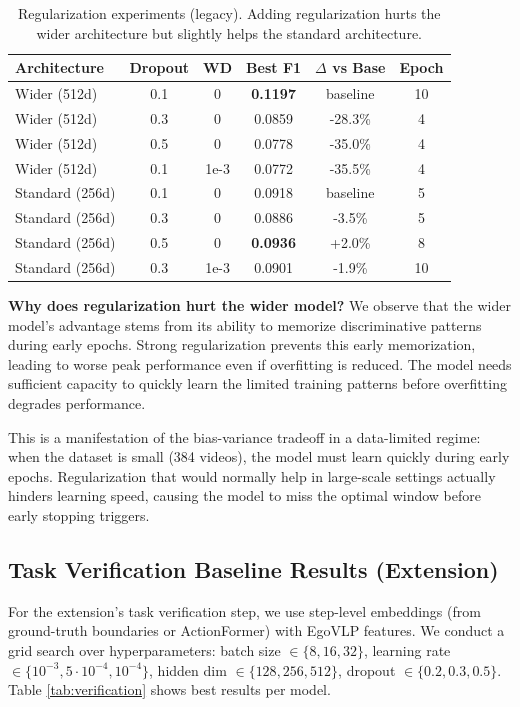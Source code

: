 \documentclass[10pt,twocolumn,letterpaper]{article}
\newcommand{\tighttabcolsep}{\setlength{\tabcolsep}{3pt}}
\newcommand{\tighttablerowstretch}{\renewcommand{\arraystretch}{1.05}}
\begin{document}
\begin{table}[h]
\centering
\caption{Regularization experiments (legacy). Adding regularization hurts the wider architecture but slightly helps the standard architecture.}
\label{tab:regularization}
{\scriptsize\tighttabcolsep\tighttablerowstretch
\begin{tabular}{lccccc}
\toprule
Architecture & Dropout & WD & Best F1 & $\Delta$ vs Base & Epoch \\
\midrule
Wider (512d) & 0.1 & 0 & \textbf{0.1197} & baseline & 10 \\
Wider (512d) & 0.3 & 0 & 0.0859 & -28.3\% & 4 \\
Wider (512d) & 0.5 & 0 & 0.0778 & -35.0\% & 4 \\
Wider (512d) & 0.1 & 1e-3 & 0.0772 & -35.5\% & 4 \\
\midrule
Standard (256d) & 0.1 & 0 & 0.0918 & baseline & 5 \\
Standard (256d) & 0.3 & 0 & 0.0886 & -3.5\% & 5 \\
Standard (256d) & 0.5 & 0 & \textbf{0.0936} & +2.0\% & 8 \\
Standard (256d) & 0.3 & 1e-3 & 0.0901 & -1.9\% & 10 \\
\bottomrule
\end{tabular}
}
\end{table}

\textbf{Why does regularization hurt the wider model?} We observe that the wider model's advantage stems from its ability to memorize discriminative patterns during early epochs. Strong regularization prevents this early memorization, leading to worse peak performance even if overfitting is reduced. The model needs sufficient capacity to quickly learn the limited training patterns before overfitting degrades performance.

This is a manifestation of the bias-variance tradeoff in a data-limited regime: when the dataset is small (384 videos), the model must learn quickly during early epochs. Regularization that would normally help in large-scale settings actually hinders learning speed, causing the model to miss the optimal window before early stopping triggers.

\subsection{Task Verification Baseline Results (Extension)}

For the extension's task verification step, we use step-level embeddings (from ground-truth boundaries or ActionFormer) with EgoVLP features. We conduct a grid search over hyperparameters: batch size $\in \{8, 16, 32\}$, learning rate $\in \{10^{-3}, 5\cdot10^{-4}, 10^{-4}\}$, hidden dim $\in \{128, 256, 512\}$, dropout $\in \{0.2, 0.3, 0.5\}$. Table \ref{tab:verification} shows best results per model.
\end{document}
